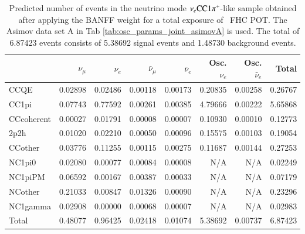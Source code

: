 \begin{table}
	\centering
	\begin{tabular} { | l ||r | r | r | r | r | r | | r | }
	\hline
	              & $\nu_\mu$            & $\nu_e$              & $\bar{\nu}_{\mu}$    & $\bar{\nu}_{e}$      & Osc. $\nu_e$         & Osc. $\bar{\nu}_{e}$ & Total                \\ \hline\hline
	 CCQE         & 0.02898              & 0.02486              & 0.00118              & 0.00173              & 0.20835              & 0.00258              & 0.26767              \\ \hline
	 CC1pi        & 0.07743              & 0.77592              & 0.00261              & 0.00385              & 4.79666              & 0.00222              & 5.65868              \\ \hline
	 CCcoherent   & 0.00027              & 0.01791              & 0.00008              & 0.00007              & 0.10930              & 0.00010              & 0.12773              \\ \hline
	 2p2h         & 0.01020              & 0.02210              & 0.00050              & 0.00096              & 0.15575              & 0.00103              & 0.19054              \\ \hline
	 CCother      & 0.03776              & 0.11255              & 0.00115              & 0.00275              & 0.11687              & 0.00144              & 0.27253              \\ \hline
	 NC1pi0       & 0.02080              & 0.00077              & 0.00084              & 0.00008              & N/A                  & N/A                  & 0.02249              \\ \hline
	 NC1piPM      & 0.06592              & 0.00167              & 0.00387              & 0.00033              & N/A                  & N/A                  & 0.07179              \\ \hline
	 NCother      & 0.21033              & 0.00847              & 0.01326              & 0.00090              & N/A                  & N/A                  & 0.23296              \\ \hline
	 NC1gamma     & 0.02908              & 0.00000              & 0.00068              & 0.00007              & N/A                  & N/A                  & 0.02983              \\ \hline
	\hline
	 Total        & 0.48077              & 0.96425              & 0.02418              & 0.01074              & 5.38692              & 0.00737              & 6.87423              \\ \hline
	
	\end{tabular}
	\caption{Predicted number of events in the neutrino mode $\nu_{e} \textrm{CC}1\pi^{+}$-like sample obtained after applying the BANFF weight for a total exposure of \TotalPotNuRunOneNine\ FHC POT. The Asimov data set A in Tab \ref{tab:osc_params_joint_asimovA} is used. The total of 6.87423 events consists of 5.38692 signal events and 1.48730 background events.}
	\label{tab:event_rates_exp_MultiRe_Run1-9d}
\end{table}

%
%
%
%
%
%
%
